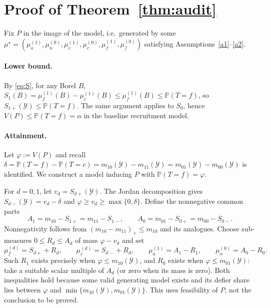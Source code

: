 \documentclass{article}
\theoremstyle{remark}
\newcommand{\Prob}{\mathbb{P}}
\newcommand{\Yspace}{\mathcal{Y}}
\begin{document}
\clearpage




\appendix

\section{Proof of Theorem~\ref{thm:audit}}\label{app:proof}

Fix $P$ in the image of the model, i.e.\ generated by some $\mu^\star=(\mu_a^{(1)},\mu_n^{(0)},\mu_c^{(1)},\mu_c^{(0)},\mu_f^{(1)},\mu_f^{(0)})$ satisfying Assumptions~\ref{a1}--\ref{a2}.

\paragraph{Lower bound.} By \eqref{eq:S}, for any Borel $B$, $S_1(B)=\mu_f^{(1)}(B)-\mu_c^{(1)}(B)\le\mu_f^{(1)}(B)\le\Prob(T=f)$, so $S_{1+}(\Yspace)\le\Prob(T=f)$. The same argument applies to $S_0$, hence $V(P)\le\Prob(T=f)=\alpha$ in the baseline recruitment model.

\paragraph{Attainment.} Let $\varphi:=V(P)$ and recall $\delta=\Prob(T=f)-\Prob(T=c)=m_{10}(\Yspace)-m_{11}(\Yspace)=m_{01}(\Yspace)-m_{00}(\Yspace)$ is identified. We construct a model inducing $P$ with $\Prob(T=f)=\varphi$.

For $d=0,1$, let $v_d=S_{d+}(\Yspace)$. The Jordan decomposition gives
$S_{d-}(\Yspace)=v_d-\delta$ and $\varphi\ge v_d\ge\max\{0,\delta\}$.
Define the nonnegative common parts
\[
A_1=m_{10}-S_{1+}=m_{11}-S_{1-},\qquad
A_0=m_{01}-S_{0+}=m_{00}-S_{0-}.
\]
Nonnegativity follows from $(m_{10}-m_{11})_+\le m_{10}$ and its analogues.
Choose sub-measures $0\le R_d\le A_d$ of mass $\varphi-v_d$ and set
\[
\mu_f^{(d)}=S_{d+}+R_d,\qquad
\mu_c^{(d)}=S_{d-}+R_d,\qquad
\mu_a^{(1)}=A_1-R_1,\qquad \mu_n^{(0)}=A_0-R_0.
\]
Such $R_1$ exists precisely when $\varphi\le m_{10}(\Yspace)$, and $R_0$
exists when $\varphi\le m_{01}(\Yspace)$: take a suitable scalar multiple
of $A_d$ (or zero when its mass is zero). Both inequalities hold because some
valid generating model exists and its defier share lies between $\varphi$ and
$\min\{m_{10}(\Yspace),m_{01}(\Yspace)\}$. This uses feasibility of $P$,
not the conclusion to be proved.
\end{document}
